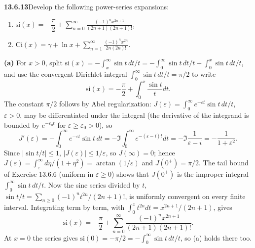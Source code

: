 \par\bigskip
\noindent\textbf{13.6.13}\quad Develop the following power-series expansions:
\begin{enumerate}
\item[(a)] $\mathrm{si}(x)=-\dfrac{\pi}{2}
  +\displaystyle\sum_{n=0}^{\infty}\frac{(-1)^{n}x^{2n+1}}{(2n+1)(2n+1)!}$,
\item[(b)] $\mathrm{Ci}(x)=\gamma+\ln x
  +\displaystyle\sum_{n=1}^{\infty}\frac{(-1)^{n}x^{2n}}{2n(2n)!}$.
\end{enumerate}
\par\smallskip
{}
\solution
\textbf{(a)} For $x>0$, split
$\mathrm{si}(x)=-\int_x^\infty\sin t\,dt/t
=-\int_0^\infty\sin t\,dt/t+\int_0^x\sin t\,dt/t$, and use the
convergent Dirichlet integral $\int_0^\infty\sin t\,dt/t=\pi/2$ to write
\[
\mathrm{si}(x)=-\frac\pi2+\int_0^x\frac{\sin t}{t}dt.
\]
The constant $\pi/2$ follows by Abel regularization:
$J(\varepsilon)=\int_0^\infty e^{-\varepsilon t}\sin t\,dt/t$,
$\varepsilon>0$, may be differentiated under the integral (the
derivative of the integrand is bounded by $e^{-\varepsilon_0t}$
for $\varepsilon\ge\varepsilon_0>0$), so
\[
J'(\varepsilon)=-\int_0^\infty e^{-\varepsilon t}\sin t\,dt
=-\Im\int_0^\infty e^{-(\varepsilon-i)t}dt
=-\Im\frac1{\varepsilon-i}=-\frac1{1+\varepsilon^2}.
\]
Since $|\sin t/t|\le1$, $|J(\varepsilon)|\le1/\varepsilon$, so
$J(\infty)=0$; hence
$J(\varepsilon)=\int_\varepsilon^\infty d\eta/(1+\eta^2)
=\arctan(1/\varepsilon)$ and $J(0^+)=\pi/2$.  The tail bound of
Exercise 13.6.6 (uniform in $\varepsilon\ge0$) shows that $J(0^+)$
is the improper integral $\int_0^\infty\sin t\,dt/t$.
Now the sine series divided by $t$,
$\sin t/t=\sum_{n\ge0}(-1)^nt^{2n}/(2n+1)!$, is uniformly convergent
on every finite interval.  Integrating term by term, with
$\int_0^xt^{2n}dt=x^{2n+1}/(2n+1)$, gives
\[
\boxed{\mathrm{si}(x)=-\frac\pi2+
\sum_{n=0}^{\infty}\frac{(-1)^nx^{2n+1}}{(2n+1)(2n+1)!}}.
\]
At $x=0$ the series gives
$\mathrm{si}(0)=-\pi/2=-\int_0^\infty\sin t\,dt/t$, so (a) holds
there too.

